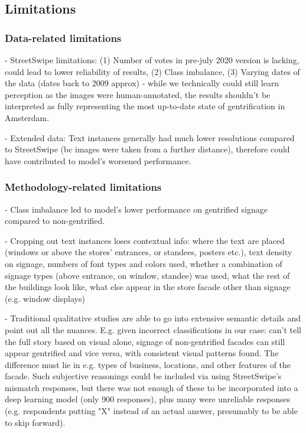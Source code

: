 \subsection{Limitations}
\subsubsection{Data-related limitations}

- StreetSwipe limitations: (1) Number of votes in pre-july 2020 version is lacking, could lead to lower reliability of results, (2) Class imbalance, (3) Varying dates of the data (dates back to 2009 approx) - while we technically could still learn perception as the images were human-annotated, the results shouldn't be interpreted as fully representing the most up-to-date state of gentrification in Amsterdam.

- Extended data: Text instances generally had much lower resolutions compared to StreetSwipe (bc images were taken from a further distance), therefore could have contributed to model's worsened performance.

\subsubsection{Methodology-related limitations}

- Class imbalance led to model's lower performance on gentrified signage compared to non-gentrified.

- Cropping out text instances loses contextual info: where the text are placed (windows or above the stores' entrances, or standees, posters etc.), text density on signage, numbers of font types and colors used, whether a combination of signage types (above entrance, on window, standee) was used, what the rest of the buildings look like, what else appear in the store facade other than signage (e.g. window displays)

- Traditional qualitative studies are able to go into extensive semantic details and point out all the nuances. E.g. given incorrect classifications in our case: can't tell the full story based on visual alone, signage of non-gentrified facades can still appear gentrified and vice versa, with consistent visual patterns found. The difference must lie in e.g. types of business, locations, and other features of the facade. Such subjective reasonings could be included via using StreetSwipe's mismatch responses, but there was not enough of these to be incorporated into a deep learning model (only 900 responses), plus many were unreliable responses (e.g. respondents putting "X" instead of an actual answer, presumably to be able to skip forward).
